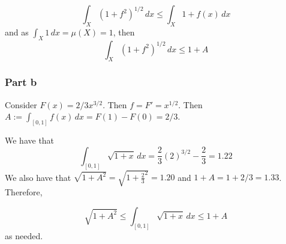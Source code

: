 \documentclass{article}
\theoremstyle{definition}
\numberwithin{theorem}{section}
\numberwithin{equation}{section}
\begin{document}
\begin{equation}
\int_X \left(1 + f^2\right)^{1/2} \, dx \leq \int_X 1 + f(x) \, dx
\end{equation}
and as $\int_X 1 \, dx = \mu(X) = 1$, then 
\begin{equation}
	\int_X \left(1 + f^2\right)^{1/2} \, dx \leq 1 + A
\end{equation}
\subsubsection*{Part b}
Consider $F(x) = 2/3 x^{3/2}$. Then $f = F' = x^{1/2}$. Then $A := \int_{[0,1]} f(x) \, dx =  F(1) - F(0) = 2/3$. 

We have that
\begin{equation}
	\int_{[0,1]} \sqrt{1 + x} \, dx = \frac{2}{3} (2)^{3/2} - \frac{2}{3} = 1.22
\end{equation}
We also have that $\sqrt{1 + A^2} = \sqrt{1 + \frac{2}{3}^2} = 1.20$ and $1 + A = 1 + 2/3 = 1.33$. Therefore, 

\begin{equation}
	\sqrt{1 + A^2} \leq \int_{[0,1]} \sqrt{1 + x} \, dx \leq 1 + A
\end{equation}
as needed.
\end{document}
